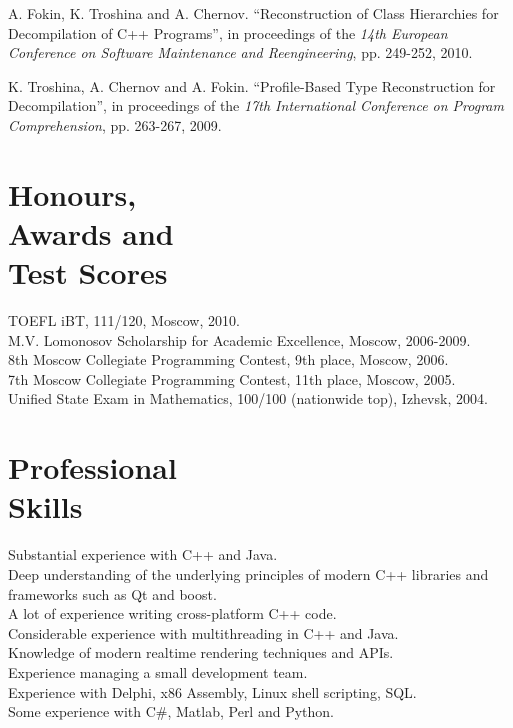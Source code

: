 \documentclass[margin,line]{CV}
\begin{document}
\begin{resume}
	A. Fokin, K. Troshina and A. Chernov. ``Reconstruction of Class Hierarchies for Decompilation of C++ Programs'',
    in proceedings of the \textsl{14th European Conference on Software Maintenance and Reengineering}, pp. 249-252, 2010.

    K. Troshina, A. Chernov and A. Fokin. ``Profile-Based Type Reconstruction for Decompilation'',
    in proceedings of the \textsl{17th International Conference on Program Comprehension}, pp. 263-267, 2009.

    \pagebreak    
    
    \section{\mysidestyle Honours, \\Awards and \\Test Scores}
    TOEFL iBT, 111/120, Moscow, 2010.                                                               \vspace{1mm}\\
    M.V. Lomonosov Scholarship for Academic Excellence, Moscow, 2006-2009.                          \vspace{1mm}\\
    8th Moscow Collegiate Programming Contest, 9th place, Moscow, 2006.                             \vspace{1mm}\\
    7th Moscow Collegiate Programming Contest, 11th place, Moscow, 2005.                            \vspace{1mm}\\
    Unified State Exam in Mathematics, 100/100 (nationwide top), Izhevsk, 2004.                     \vspace{1mm}

    \section{\mysidestyle Professional\\Skills}
    Substantial experience with C++ and Java. \\
	Deep understanding of the underlying principles of modern C++ libraries and frameworks such as Qt and boost. \\
    A lot of experience writing cross-platform C++ code. \\
    Considerable experience with multithreading in C++ and Java. \\
    Knowledge of modern realtime rendering techniques and APIs. \\
	Experience managing a small development team. \\
    Experience with Delphi, x86 Assembly, Linux shell scripting, SQL. \\
    Some experience with C\#, Matlab, Perl and Python.


\end{resume}
\end{document}
